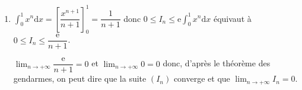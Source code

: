 \documentclass[10pt]{article}
\providecommand{\e}{{\mathrm{e}}}
\renewcommand{\d}{{\mathrm{d}}}
\providecommand{\ds}{\displaystyle}
\begin{document}
\begin{enumerate}
\begin{list}{\textbullet}{}
Sur $\left [0\;;\;1\strut\right ]$, on a $x^n\geqslant 0$ donc $x^n \e^{x} \leqslant \e x^n$.

D'après la positivité de l'intégration, $\ds\int_{0}^{1} x^n \e^{x} \d x \leqslant \ds\int_{0}^{1} x^n \e \d x$, ce qui veut dire: $I_n \leqslant \e \ds\int_{0}^{1} x^n \d x$.
\end{list} 

On a donc démontré que: $0\leqslant I_n \leqslant  \e \ds\int_{0}^{1} x^n \d x$.

		\item 
$\ds\int_{0}^{1} x^n \d x = \left [ \dfrac{x^{n+1}}{n+1} \right ]_{0}^{1}=\dfrac{1}{n+1}$
donc $0\leqslant I_n \leqslant  \e \ds\int_{0}^{1} x^n \d x$ équivaut à $0\leqslant I_n \leqslant\dfrac{\e}{n+1}$.

$\ds\lim_{n\to +\infty} \dfrac{\e}{n+1}=0$ et $\ds\lim_{n\to +\infty} 0=0$ donc, d'après le théorème des gendarmes, on peut dire que la suite $(I_n)$ converge et que $\ds\lim_{n\to +\infty} I_n=0$.
		
	\end{enumerate}
\end{document}
